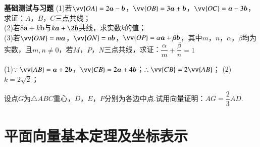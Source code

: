 \begin{exercise}{\textbf{基础测试与习题}}
      (1)若$\vv{OA}=2\bm a-\bm b$，$\vv{OB}=3\bm a+\bm b$，$\vv{OC}=\bm a-3\bm b$，求证：$A$，$B$，$C$三点共线；\\
      (2)若$8\bm a+k\bm b$与$k\bm a+\2\bm b$共线，求实数$k$的值；\\
      (3)若$\vv{OM}=m\bm a$，$\vv{ON}=n\bm b$，$\vv{OP}=\alpha\bm a+\beta\bm b$，其中$m$，$n$，$\alpha$，$\beta$均为实数，且$m,n\neq 0$，若$M$，$P$，$N$三点共线，求证：$\dfrac{\alpha}m+\dfrac{\beta}n=1$
      \begin{answer}
        (1)$\because \vv{AB}=\bm a+2\bm b$，$\vv{CB}=2\bm a+4\bm b$；$\therefore \vv{CB}=2\vv{AB}$；
        (2)$k=2\sqrt2$；
      \end{answer}
      \vspace{4cm}
    \item
      设点$G$为$\triangle ABC$重心，$D$，$E$，$F$分别为各边中点.试用向量证明：$AG=\dfrac23 AD$.
      \begin{flushright}
      \end{flushright}
    \vspace{2cm}
  \end{exercise}
\section{平面向量基本定理及坐标表示}
